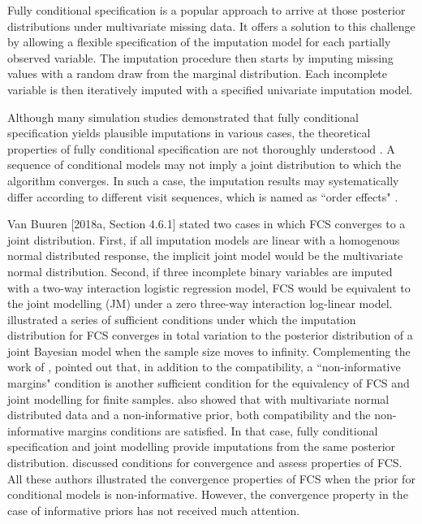 Fully conditional specification is a popular approach to arrive at those posterior distributions under multivariate missing data. It offers a solution to this challenge by allowing a flexible specification of the imputation model for each partially observed variable. The imputation procedure then starts by imputing missing values with a random draw from the marginal distribution. Each incomplete variable is then iteratively imputed with a specified univariate imputation model. 

Although many simulation studies demonstrated that fully conditional specification yields plausible imputations in various cases, the theoretical properties of fully conditional specification are not thoroughly understood \citep{van2007multiple}. A sequence of conditional models may not imply a joint distribution to which the algorithm converges. In such a case, the imputation results may systematically differ according to different visit sequences, which is named as ``order effects" \citep{hughes2014joint}. 

Van Buuren  [2018a, Section 4.6.1] stated two cases in which FCS converges to a joint distribution. First, if all imputation models are linear with a homogenous normal distributed response, the implicit joint model would be the multivariate normal distribution. Second, if three incomplete binary variables are imputed with a two-way interaction logistic regression model, FCS would be equivalent to the joint modelling (JM) under a zero three-way interaction log-linear model. \citet{liu2014stationary} illustrated a series of sufficient conditions under which the imputation distribution for FCS converges in total variation to the posterior distribution of a joint Bayesian model when the sample size moves to infinity. Complementing the work of \citet{liu2014stationary}, \citet{hughes2014joint} pointed out that, in addition to the compatibility, a ``non-informative margins" condition is another sufficient condition for the equivalency of FCS and joint modelling for finite samples. \citet{hughes2014joint} also showed that with multivariate normal distributed data and a non-informative prior, both compatibility and the non-informative margins conditions are satisfied. In that case, fully conditional specification and joint modelling provide imputations from the same posterior distribution. \citet{zhu2015convergence} discussed conditions for convergence and assess properties of FCS. All these authors illustrated the convergence properties of FCS when the prior for conditional models is non-informative. However, the convergence property in the case of informative priors has not received much attention.       


